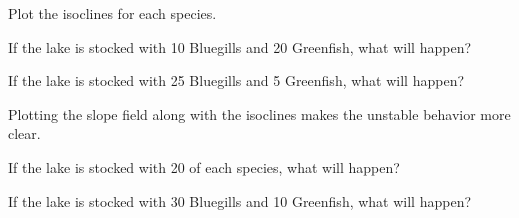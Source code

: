 \begin{applicationActivities}
\begin{activity}{15}
\begin{subactivity}
Plot the isoclines for each species.
\end{subactivity}
\begin{subactivity}
If the lake is stocked with 10 Bluegills and 20 Greenfish, what will happen?
\end{subactivity}
\begin{subactivity}
If the lake is stocked with 25 Bluegills and 5 Greenfish, what will happen?
\end{subactivity}

\end{activity}

\begin{activity}{5}
Plotting the slope field along with the isoclines makes the unstable behavior more clear.
\begin{center}
\end{center}

\begin{subactivity}
If the lake is stocked with 20 of each species, what will happen?
\end{subactivity}
\begin{subactivity}
If the lake is stocked with 30 Bluegills and 10 Greenfish, what will happen?
\end{subactivity}
\end{activity}

\end{applicationActivities}
